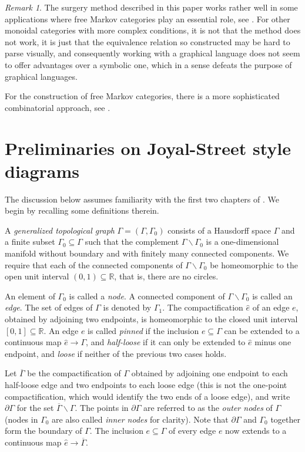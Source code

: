\documentclass[12pt]{amsart}
\theoremstyle{plain}
\theoremstyle{definition}
\theoremstyle{remark}
\newtheorem{rem}[thm]{Remark}
\numberwithin{equation}{section}
\theoremstyle{plain}
\newcommand{\R}{\mathds{R}}
\newcommand{\0}{\emptyset}
\newcommand{\fun}{\longrightarrow}
\newcommand{\sub}{\subseteq}
\newcommand{\mi}{\smallsetminus}
\newcommand{\memph}[1]{{\color{magenta}\emph{#1}}}
\begin{document}
\begin{rem}
The surgery method described in this paper works  rather well in some applications where free Markov categories play an essential role, see \cite{yinzhang2021}. For other monoidal categories with more complex conditions, it is not that the method does not work, it is just that the equivalence relation so constructed may be hard to parse visually, and consequently working with a graphical language does not seem to offer advantages over a symbolic one, which in a sense defeats the purpose of graphical languages.

For the construction of free Markov categories, there is a more sophisticated combinatorial approach, see \cite{FriLiang2022}.
\end{rem}


\section{Preliminaries on Joyal-Street style diagrams}

The discussion below assumes familiarity with the first two chapters of  \cite{joyal1991geometry}. We begin by recalling some definitions therein.

A \memph{generalized topological graph} $\Gamma = (\Gamma, \Gamma_0)$ consists of a Hausdorff space $\Gamma$ and a finite subset $\Gamma_0 \sub  \Gamma$ such that the complement $\Gamma \mi  \Gamma_0$ is a one-dimensional manifold without boundary and with finitely many connected components. We require that each of the connected components of $\Gamma \mi  \Gamma_0$ be homeomorphic to the open unit interval $(0, 1) \sub \R$, that is, there are no circles.

An element of $\Gamma_0$ is called a \memph{node}. A connected component of $\Gamma \mi \Gamma_0$ is called an \memph{edge}. The set of edges of $\Gamma$ is denoted by $\Gamma_1$. The  compactification $\hat e$ of an edge $e$, obtained by adjoining two endpoints, is homeomorphic to the closed unit interval $[0, 1] \sub \R$. An edge $e$ is called \memph{pinned} if the inclusion $e \sub \Gamma$ can be extended to a continuous map $\hat e  \fun \Gamma$, and \memph{half-loose} if it can only be extended to $\hat e$ minus one endpoint,  and \memph{loose} if neither of the previous two cases holds.

Let $\overline \Gamma$ be the compactification of $\Gamma$ obtained by adjoining one endpoint to each half-loose edge and two endpoints to each loose edge (this is not the one-point compactification, which would identify the two ends of a loose edge), and write $\partial \Gamma$ for the set $\overline \Gamma \mi \Gamma$. The points in $\partial \Gamma$ are referred to as the \memph{outer nodes} of $\Gamma$ (nodes in $\Gamma_0$ are also called \memph{inner nodes} for clarity). Note that $\partial \Gamma$ and $\Gamma_0$ together form the boundary of $\Gamma$. The inclusion $e \sub \Gamma$ of every edge $e$ now extends to a continuous map $\hat e \fun \overline \Gamma$.
\end{document}
